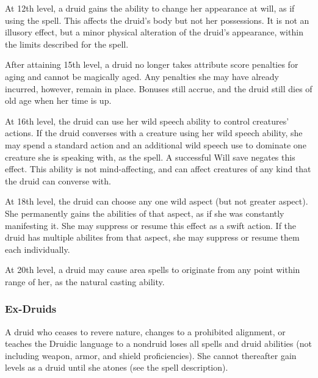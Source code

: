  At 12th level, a druid gains the ability to change
her appearance at will, as if using the  spell. This affects the druid's body but not her possessions. It is not an illusory effect, but a minor physical alteration of the druid's appearance, within the limits described for the spell.

 After attaining 15th level, a druid no longer takes attribute score penalties for aging and cannot be magically aged. Any penalties she may have already incurred, however, remain in place. Bonuses still accrue, and the druid still dies of old age when her time is up.

 At 16th level, the druid can use her wild speech ability to control creatures' actions. If the druid converses with a creature using her wild speech ability, she may spend a standard action and an additional wild speech use to dominate one creature she is speaking with, as the  spell. A successful Will save negates this effect. This ability is not mind-affecting, and can affect creatures of any kind that the druid can converse with.

 At 18th level, the druid can choose any one wild aspect (but not greater aspect). She permanently gains the abilities of that aspect, as if she was constantly manifesting it. She may suppress or resume this effect as a swift action. If the druid has multiple abilites from that aspect, she may suppress or resume them each individually.

 At 20th level, a druid may cause area spells to originate from any point within \rngmed range of her, as the natural casting ability.

\subsubsection{Ex-Druids}
A druid who ceases to revere nature, changes to a prohibited alignment, or teaches the Druidic language to a nondruid loses all spells and druid abilities (not including weapon, armor, and shield proficiencies). She cannot thereafter gain levels as a druid until she atones (see the  spell description).

